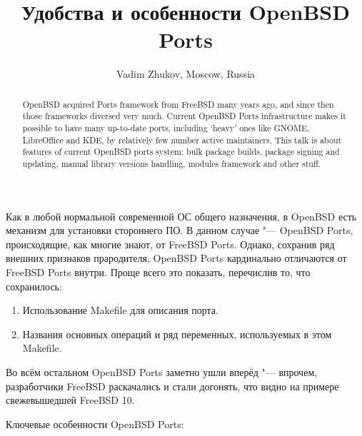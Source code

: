 \documentclass[10pt, a5paper]{article}
\begin{document}
\def\v!#1!{\texttt{#1}}
\title{Удобства и особенности OpenBSD Ports}
\author{Vadim Zhukov, Moscow, Russia}
\maketitle
\begin{abstract}
OpenBSD acquired Ports framework from FreeBSD many years ago, and since then those frameworks diversed very much. Current OpenBSD Ports infrastructure makes it possible to have many up-to-date ports, including ‘heavy’ ones like GNOME, LibreOffice and KDE, by relatively few number active maintainers. This talk is about features of current OpenBSD ports system: bulk package builds, package signing and updating, manual library versions handling, modules framework and other stuff.
\end{abstract}
Как в любой нормальной современной ОС общего назначения, в OpenBSD есть механизм для установки стороннего ПО. В данном случае "--- OpenBSD Ports, происходящие, как многие знают, от FreeBSD Ports. Однако, сохранив ряд внешних признаков прародителя, OpenBSD Ports кардинально отличаются от FreeBSD Ports внутри. Проще всего это показать, перечислив то, что сохранилось:

\begin{enumerate}
  \item Использование Makefile для описания порта.
  \item Названия основных операций и ряд переменных, используемых в этом Makefile.
\end{enumerate}

Во всём остальном OpenBSD Ports заметно ушли вперёд "--- впрочем, разработчики FreeBSD раскачались и стали догонять, что видно на примере свежевышедшей FreeBSD 10.

Ключевые особенности OpenBSD Ports:
\end{document}
